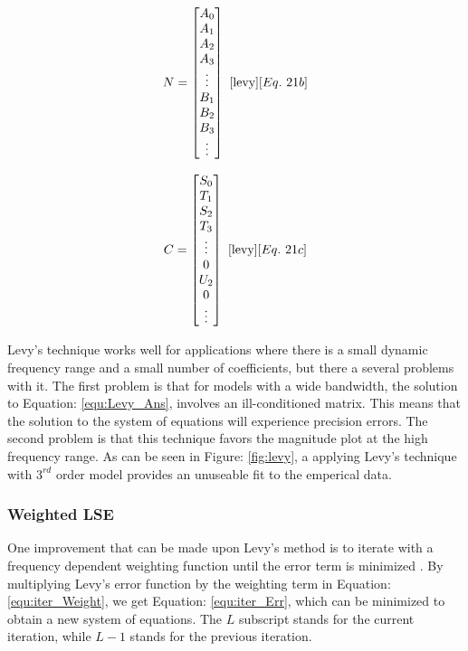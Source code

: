 \begin{multicols}{2}
    \begin{equation}
        \label{equ:Levy_N}
        N = 
        \begin{bmatrix}
            A_0 \\
            A_1 \\
            A_2 \\
            A_3 \\
            \vdots \\
            B_1 \\
            B_2 \\
            B_3 \\
            \vdots
        \end{bmatrix}
        ~\cite{levy}[Eq.~21b]
    \end{equation}

    \begin{equation}
        \label{equ:Levy_C}
        C = 
        \begin{bmatrix}
            S_0 \\
            T_1 \\
            S_2 \\
            T_3 \\
            \vdots \\
            0   \\
            U_2 \\
            0   \\
            \vdots
        \end{bmatrix}
        ~\cite{levy}[Eq.~21c]
    \end{equation}
\end{multicols}

Levy's technique works well for applications where there is a small dynamic frequency range and a small number of coefficients, but there a several problems with it.
The first problem is that for models with a wide bandwidth, the solution to Equation: \eqref{equ:Levy_Ans}, involves an ill-conditioned matrix. This means that the solution to the system of equations will experience precision errors.
The second problem is that this technique favors the magnitude plot at the high frequency range. As can be seen in Figure: \ref{fig:levy}, a applying Levy's technique with $3^{rd}$ order model provides an unuseable fit to the emperical data.



\subsubsection{Weighted LSE}
\label{sec:weightedLSE}
One improvement that can be made upon Levy's method is to iterate with a frequency dependent weighting function until the error term is minimized \cite{levy_iter}. By multiplying Levy's error function by the weighting term in Equation: \eqref{equ:iter_Weight}, we get Equation: \eqref{equ:iter_Err}, which can be minimized to obtain a new system of equations.
The $L$ subscript stands for the current iteration, while $L-1$ stands for the previous iteration.

